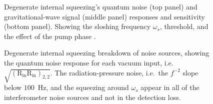 
\begin{figure}
	\centering
	\caption{ Degenerate internal squeezing's quantum noise (top panel) and gravitational-wave signal (middle panel) responses and sensitivity (bottom panel). Showing the sloshing frequency $\omega_s$, threshold, and the effect of the pump phase . }
	\label{fig:dIS_sensitivity}
\end{figure}

\begin{figure}
	\centering
	\caption{Degenerate internal squeezing breakdown of noise sources, showing the quantum noise response for each vacuum input, i.e. $\sqrt{(\text{R}_\text{in}\text{R}_\text{in})_{2,2}}$. The radiation-pressure noise, i.e.\ the $f^{-2}$ slope below $100$~Hz, and the squeezing around $\omega_s$ appear in all of the interferometer noise sources and not in the detection loss.}
	\label{fig:dIS_noise_budget}
\end{figure}

